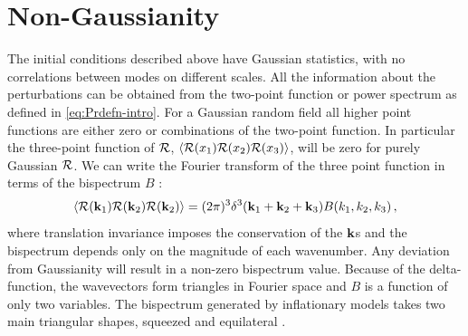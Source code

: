 \section{Non-Gaussianity}
\label{sec:fnl-intro}
The initial conditions described above have Gaussian statistics, with no correlations between modes
on different scales. All the information about the perturbations can be obtained from the
two-point function or power spectrum as defined in \eqref{eq:Prdefn-intro}. For a Gaussian random 
field all higher point functions are either zero or combinations of the two-point function. In
particular the three-point function of $\mathcal{R}$, $\langle
\mathcal{R}(x_1)\mathcal{R}(x_2)\mathcal{R}(x_3)\rangle$, will be zero for purely Gaussian $\mathcal{R}$. We can
write the Fourier
transform of the three point function in terms of the bispectrum $B$
\cite{Bartolo:2004if}:
% 
\begin{equation}
 \langle \mathcal{R}(\textbf{k}_1)\mathcal{R}(\textbf{k}_2)\mathcal{R}(\textbf{k}_2)\rangle = (2\pi)^3 \delta^3(\textbf{k}_1 + \textbf{k}_2 + \textbf{k}_3) B(k_1, k_2,
k_3)\,,
\end{equation}
% 
where translation invariance imposes the conservation of the $\textbf{k}$s and
the bispectrum
depends only on the magnitude of each wavenumber. Any deviation from Gaussianity
will result in a
non-zero bispectrum value. 
Because of the delta-function, the wavevectors form triangles in Fourier
space and $B$ is a function of only two variables. The bispectrum generated by
inflationary models
takes two main triangular shapes, squeezed and equilateral \cite{Babich:2004gb}.
 
